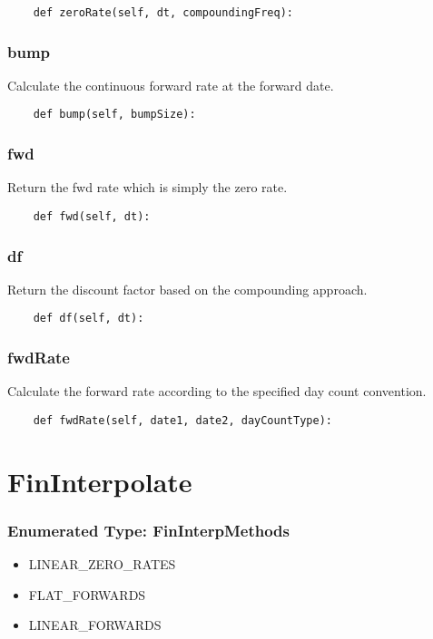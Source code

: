 \documentclass[twoside,11pt]{book}
\begin{document}
\begin{lstlisting}
    def zeroRate(self, dt, compoundingFreq):
\end{lstlisting}

\subsubsection*{{\bf bump}}
Calculate the continuous forward rate at the forward date.  

\begin{lstlisting}
    def bump(self, bumpSize):
\end{lstlisting}

\subsubsection*{{\bf fwd}}
Return the fwd rate which is simply the zero rate.  

\begin{lstlisting}
    def fwd(self, dt):
\end{lstlisting}

\subsubsection*{{\bf df}}
Return the discount factor based on the compounding approach.  

\begin{lstlisting}
    def df(self, dt):
\end{lstlisting}

\subsubsection*{{\bf fwdRate}}
Calculate the forward rate according to the specified day count convention.  

\begin{lstlisting}
    def fwdRate(self, date1, date2, dayCountType):
\end{lstlisting}

\newpage
\section{FinInterpolate}

\subsubsection{Enumerated Type: FinInterpMethods}
\begin{itemize}
\item{LINEAR\_ZERO\_RATES}
\item{FLAT\_FORWARDS}
\item{LINEAR\_FORWARDS}
\end{itemize}
\end{document}
